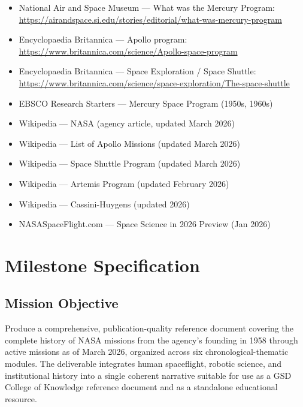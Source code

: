 \documentclass[11pt,letterpaper]{article}
\newcommand{\stageheader}[2]{%
  \noindent\colorbox{#2}{\makebox[\textwidth][l]{%
    \textcolor{white}{\bfseries\sffamily\hspace{6pt}#1\hspace{6pt}}}}%
  \vspace{0.5em}\par%
}
\begin{document}
\begin{itemize}[leftmargin=*]
  \item National Air and Space Museum --- What was the Mercury Program: \url{https://airandspace.si.edu/stories/editorial/what-was-mercury-program}
  \item Encyclopaedia Britannica --- Apollo program: \url{https://www.britannica.com/science/Apollo-space-program}
  \item Encyclopaedia Britannica --- Space Exploration / Space Shuttle: \url{https://www.britannica.com/science/space-exploration/The-space-shuttle}
  \item EBSCO Research Starters --- Mercury Space Program (1950s, 1960s)
  \item Wikipedia --- NASA (agency article, updated March 2026)
  \item Wikipedia --- List of Apollo Missions (updated March 2026)
  \item Wikipedia --- Space Shuttle Program (updated March 2026)
  \item Wikipedia --- Artemis Program (updated February 2026)
  \item Wikipedia --- Cassini-Huygens (updated 2026)
  \item NASASpaceFlight.com --- Space Science in 2026 Preview (Jan 2026)
\end{itemize}

\newpage

\stageheader{STAGE 3 --- MISSION PACKAGE}{accent}

\section{Milestone Specification}

\subsection{Mission Objective}

Produce a comprehensive, publication-quality reference document covering the complete history of NASA missions from the agency's founding in 1958 through active missions as of March 2026, organized across six chronological-thematic modules. The deliverable integrates human spaceflight, robotic science, and institutional history into a single coherent narrative suitable for use as a GSD College of Knowledge reference document and as a standalone educational resource.
\end{document}
